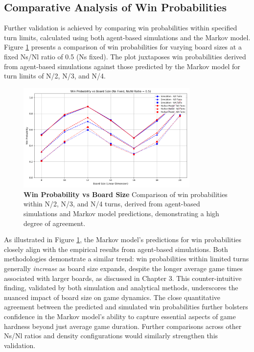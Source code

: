 \subsection{Comparative Analysis of Win Probabilities}

Further validation is achieved by comparing win probabilities within specified turn limits, calculated using both agent-based simulations and the Markov model. Figure \ref{fig:winprobability_NsFixed_05} presents a comparison of win probabilities for varying board sizes at a fixed Ns/Nl ratio of 0.5 (Ns fixed).  The plot juxtaposes win probabilities derived from agent-based simulations against those predicted by the Markov model for turn limits of N/2, N/3, and N/4.

\begin{figure}[th]
	\centering
	\includegraphics[width=0.8\textwidth]{"../Markov Modelling/Code/plots/plots/chapter4_validation/win_probability_plot_NsFixed_05.png"}
	\caption{\textbf{Win Probability vs Board Size} Comparison of win probabilities within N/2, N/3, and N/4 turns, derived from agent-based simulations and Markov model predictions, demonstrating a high degree of agreement.}
	\label{fig:winprobability_NsFixed_05}
\end{figure}

As illustrated in Figure \ref{fig:winprobability_NsFixed_05}, the Markov model's predictions for win probabilities closely align with the empirical results from agent-based simulations. Both methodologies demonstrate a similar trend: win probabilities within limited turns generally \textit{increase} as board size expands, despite the longer average game times associated with larger boards, as discussed in Chapter 3.  This counter-intuitive finding, validated by both simulation and analytical methods, underscores the nuanced impact of board size on game dynamics. The close quantitative agreement between the predicted and simulated win probabilities further bolsters confidence in the Markov model's ability to capture essential aspects of game hardness beyond just average game duration.  Further comparisons across other Ns/Nl ratios and density configurations would similarly strengthen this validation.

